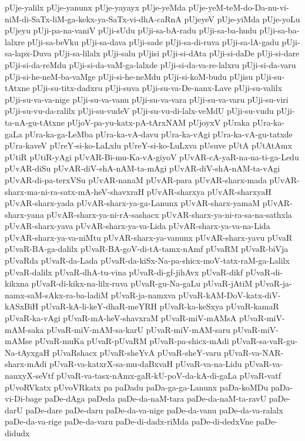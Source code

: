 {pUje-yalilx
pUje-yanunx
pUje-yayayx
pUje-yeMda
pUje-yeM-teM-do-Da-nu-vi-niM-di-SaTx-liM-ga-kekx-ya-SaTx-vi-dhA-caRnA
pUjeyeV
pUje-yiMda
pUje-yoLu
pUjeyu
pUji-pa-na-vaniV
pUji-sUdu
pUji-sa-bA-radu
pUji-sa-ba-hudu
pUji-sa-ba-lalxre
pUji-sa-beVku
pUji-sa-dava
pUji-sade
pUji-sa-di-ruva
pUji-sa-lA-gadu
pUji-sa-lapx-Duva
pUji-sa-lilalx
pUji-salu
pUjisi
pUji-si-dAta
pUji-si-daDe
pUji-si-dare
pUji-si-da-reMdu
pUji-si-da-vaM-ga-lalxde
pUji-si-da-va-re-lalxru
pUji-si-da-varu
pUji-si-he-neM-ba-vaMge
pUji-si-he-neMdu
pUji-si-koM-budu
pUjisu
pUji-su-tAtxne
pUji-su-titx-dadxru
pUji-suva
pUji-su-va-De-nanx-Lave
pUji-su-valilx
pUji-su-va-va-nige
pUji-su-va-vanu
pUji-su-va-vara
pUji-su-va-varu
pUji-su-viri
pUji-su-vu-da-ralilx
pUji-su-vudeV
pUji-su-vu-di-lalx-veMdU
pUji-su-vudu
pUji-ta-nA-gu-tAtxne
pUjoV-pa-yu-katx-pA-tArxNAM
pUjoyxV
pUraka
pUra-ka-gaLa
pUra-ka-ga-LeMba
pUra-ka-vA-davu
pUra-ka-vAgi
pUra-ka-vA-gu-tatxde
pUra-kaveV
pUreY-si-ko-LaLxlu
pUreY-si-ko-LuLxva
pUsuve
pUtA
pUtAtAmx
pUtiR
pUtiR-yAgi
pUvAR-Bi-mu-Ka-vA-giyoV
pUvAR-cA-yaR-na-na-ti-ga-Ledu
pUvAR-diSu
pUvAR-diV-shA-nAM-ta-mAgi
pUvAR-diV-shA-nAM-ta-vAgi
pUvAR-di-pa-terxVSu
pUvAR-nanaM
pUvAR-para
pUvAR-sharx-mada
pUvAR-sharx-ma-ni-ra-satx-mA-heV-shavxraH
pUvAR-sharxya
pUvAR-sharxyaH
pUvAR-sharx-yada
pUvAR-sharx-ya-ga-Lanunx
pUvAR-sharx-yamaM
pUvAR-sharx-yana
pUvAR-sharx-ya-ni-rA-sashacx
pUvAR-sharx-ya-ni-ra-sa-na-sathxla
pUvAR-sharx-yava
pUvAR-sharx-ya-va-Lida
pUvAR-sharx-ya-va-na-Lida
pUvAR-sharx-ya-va-niMtu
pUvAR-sharx-ya-vanunx
pUvAR-sharx-yavu
pUvaR
pUvaR-BA-ga-dalilx
pUvaR-BA-goV-di-tA-tamx-nAmf
pUvaRM
pUvaR-biVja
pUvaRda
pUvaR-da-Lada
pUvaR-da-kiSx-Na-pa-shicx-moV-tatx-raM-ga-Lalilx
pUvaR-dalilx
pUvaR-dhA-tu-vina
pUvaR-di-gf-jihAvx
pUvaR-dikf
pUvaR-di-kikxna
pUvaR-di-kikx-na-lilx-ruva
pUvaR-gu-Na-gaLu
pUvaR-jAtiM
pUvaR-ja-namx-saM-sAkx-ra-ba-ladiM
pUvaR-ja-namxva
pUvaR-kAM-DoV-katx-diV-kASxBiH
pUvaR-kA-li-keY-dhaR-meYRH
pUvaR-ka-keSxya
pUvaR-kamaR
pUvaR-ka-vAgi
pUvaR-mA-heV-shavxraM
pUvaR-miV-mAMsA
pUvaR-miV-mAM-saka
pUvaR-miV-mAM-sa-karU
pUvaR-miV-mAM-saru
pUvaR-miV-mAMse
pUvaR-muKa
pUvaR-pUvaRM
pUvaR-pa-shicx-mAdi
pUvaR-sa-vaR-gu-Na-tAyxgaH
pUvaRshacx
pUvaR-sheYvA
pUvaR-sheY-varu
pUvaR-va-NAR-sharx-mAdi
pUvaR-va-katxrX-sa-mu-daBxvaH
pUvaR-va-na-Lidu
pUvaR-va-nanxyX-seVtf
pUvaR-va-tasx-nAmx-gaR-kU-poV-da-kA-di-gaLa
pUvaR-vatf
pUvoRVkatx
pUvoVRkatx
pa
paDadu
paDa-ga-ga-Lanunx
paDa-koMDu
paDa-vi-Di-bage
paDe-dAga
paDeda
paDe-da-naM-tara
paDe-da-naM-ta-ravU
paDe-darU
paDe-dare
paDe-daru
paDe-da-va-nige
paDe-da-vanu
paDe-da-va-ralalx
paDe-da-va-rige
paDe-da-varu
paDe-di-dadx-riMda
paDe-di-dedxVne
paDe-didudx
}
